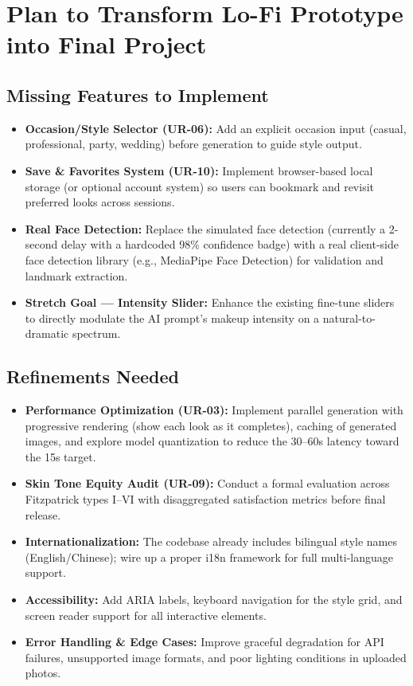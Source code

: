 \documentclass[10pt, letterpaper]{article}
\begin{document}
\section{Plan to Transform Lo-Fi Prototype into Final Project}

\subsection{Missing Features to Implement}
\begin{itemize}[leftmargin=*, nosep, topsep=2pt]
    \item \textbf{Occasion/Style Selector (UR-06):} Add an explicit occasion input (casual, professional, party, wedding) before generation to guide style output.
    \item \textbf{Save \& Favorites System (UR-10):} Implement browser-based local storage (or optional account system) so users can bookmark and revisit preferred looks across sessions.
    \item \textbf{Real Face Detection:} Replace the simulated face detection (currently a 2-second delay with a hardcoded 98\% confidence badge) with a real client-side face detection library (e.g., MediaPipe Face Detection) for validation and landmark extraction.
    \item \textbf{Stretch Goal --- Intensity Slider:} Enhance the existing fine-tune sliders to directly modulate the AI prompt's makeup intensity on a natural-to-dramatic spectrum.
\end{itemize}

\subsection{Refinements Needed}
\begin{itemize}[leftmargin=*, nosep, topsep=2pt]
    \item \textbf{Performance Optimization (UR-03):} Implement parallel generation with progressive rendering (show each look as it completes), caching of generated images, and explore model quantization to reduce the 30--60s latency toward the 15s target.
    \item \textbf{Skin Tone Equity Audit (UR-09):} Conduct a formal evaluation across Fitzpatrick types I--VI with disaggregated satisfaction metrics before final release.
    \item \textbf{Internationalization:} The codebase already includes bilingual style names (English/Chinese); wire up a proper i18n framework for full multi-language support.
    \item \textbf{Accessibility:} Add ARIA labels, keyboard navigation for the style grid, and screen reader support for all interactive elements.
    \item \textbf{Error Handling \& Edge Cases:} Improve graceful degradation for API failures, unsupported image formats, and poor lighting conditions in uploaded photos.
\end{itemize}
\end{document}
